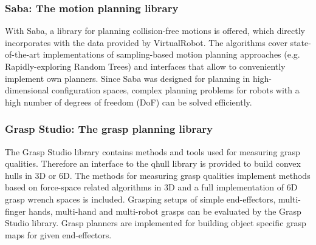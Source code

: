\subsubsection{Saba: The motion planning library}
With Saba, a library for planning collision-free motions is offered, which directly incorporates with the data provided by VirtualRobot. The algorithms cover state-of-the-art implementations of sampling-based motion planning approaches (e.g. Rapidly-exploring Random Trees) and interfaces that allow to conveniently implement own planners. Since Saba was designed for planning in high-dimensional configuration spaces, complex planning problems for robots with a high number of degrees of freedom (DoF) can be solved efficiently. 
\subsubsection{Grasp Studio: The grasp planning library}
The Grasp Studio library contains methods and tools used for measuring grasp qualities. Therefore an interface to the qhull library is provided to build convex hulls in 3D or 6D. The methods for measuring grasp qualities implement methods based on force-space related algorithms in 3D and a full implementation of 6D grasp wrench spaces is included. Grasping setups of simple end-effectors, multi-finger hands, multi-hand and multi-robot grasps can be evaluated by the Grasp Studio library. Grasp planners are implemented for building object specific grasp maps for given end-effectors. 
